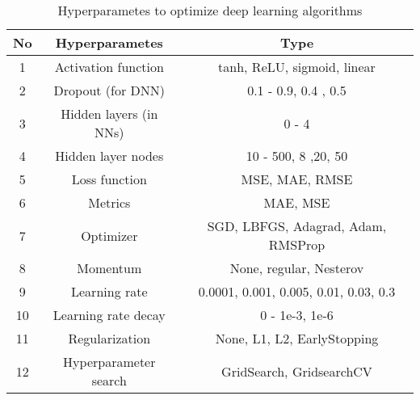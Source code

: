 \documentclass[english]{article}
\begin{document}
\begin{appendices}
\begin{table}[H]
\centering
\caption{Hyperparametes to optimize  deep learning algorithms}
\begin{tabular}{|c|c|c|}
\hline
\textbf{No} & \textbf{Hyperparametes} & \textbf{Type}                         \\ \hline
1           & Activation function     & tanh, ReLU, sigmoid, linear           \\ \hline
2           & Dropout (for DNN)       & 0.1 - 0.9, 0.4 , 0.5                  \\ \hline
3           & Hidden layers (in NNs)  & 0 - 4                                 \\ \hline
4           & Hidden layer nodes      & 10 - 500, 8 ,20, 50                   \\ \hline
5           & Loss function           & MSE, MAE, RMSE                        \\ \hline
6           & Metrics                 & MAE, MSE                              \\ \hline
7           & Optimizer               & SGD, LBFGS, Adagrad, Adam, RMSProp    \\ \hline
8           & Momentum                & None, regular, Nesterov               \\ \hline
9           & Learning rate           & 0.0001, 0.001, 0.005, 0.01, 0.03, 0.3 \\ \hline
10          & Learning rate decay     & 0 - 1e-3, 1e-6                        \\ \hline
11          & Regularization          & None, L1, L2, EarlyStopping           \\ \hline
12          & Hyperparameter search   & GridSearch, GridsearchCV              \\ \hline
\end{tabular}
\end{table}





\end{appendices}
\end{document}
